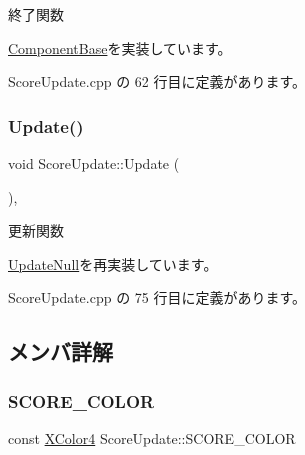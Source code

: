 終了関数 



\mbox{\hyperlink{class_component_base_a9f42beaf0383d6f629819579cab4de57}{Component\+Base}}を実装しています。



 Score\+Update.\+cpp の 62 行目に定義があります。

\mbox{\label{class_score_update_aae2b398784079a651ed92eb4c634b1c9}} 
\subsubsection{\texorpdfstring{Update()}{Update()}}
{\footnotesize\ttfamily void Score\+Update\+::\+Update (\begin{DoxyParamCaption}{ }\end{DoxyParamCaption})\hspace{0.3cm}{\ttfamily [override]}, {\ttfamily [virtual]}}



更新関数 



\mbox{\hyperlink{class_update_null_a692f4f34e4ef35ca286a1d3606fdf473}{Update\+Null}}を再実装しています。



 Score\+Update.\+cpp の 75 行目に定義があります。



\subsection{メンバ詳解}
\mbox{\label{class_score_update_ab78fc9ad68faf9f5be01096b5d60959e}} 
\subsubsection{\texorpdfstring{S\+C\+O\+R\+E\+\_\+\+C\+O\+L\+OR}{SCORE\_COLOR}}
{\footnotesize\ttfamily const \mbox{\hyperlink{_vector3_d_8h_a680c30c4a07d86fe763c7e01169cd6cc}{X\+Color4}} Score\+Update\+::\+S\+C\+O\+R\+E\+\_\+\+C\+O\+L\+OR\hspace{0.3cm}{\ttfamily [static]}}



